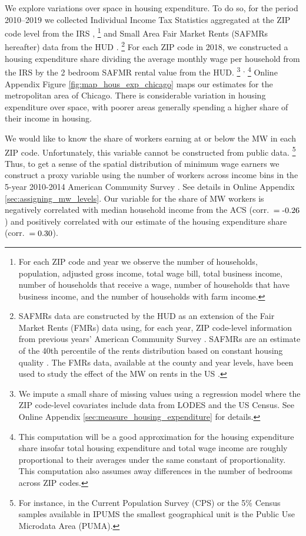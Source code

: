 We explore variations over space in housing expenditure.
To do so, for the period 2010--2019
we collected Individual Income Tax Statistics aggregated at the ZIP code 
level from the IRS \parencite{IRS},%
\footnote{For each ZIP code and year we observe the number of households, 
population, adjusted gross income, total wage bill, total business income, 
number of households that receive a wage, number of households that have 
business income, and the number of households with farm income.}
and Small Area Fair Market Rents (SAFMRs hereafter) data from the HUD 
\parencite{hudSAFMR}.%
\footnote{SAFMRs data are constructed by the HUD as an extension of the
Fair Market Rents (FMRs) data using, for each year, ZIP code-level information
from previous years' American Community Survey 
\parencite[][, p.\ 35]{SafmrReport2018}.
SAFMRs are an estimate of the 40th percentile of the rents distribution
based on constant housing quality \parencite[][, p.\ 1]{SafmrReport2018}.
The FMRs data, available at the county and year levels, have been used to study 
the effect of the MW on rents in the US \parencite{Tidemann2018, Yamagishi2019}.}
For each ZIP code in 2018, we constructed a housing expenditure share dividing 
the average monthly wage per household from the IRS by the 2 bedroom SAFMR 
rental value from the HUD.%
\footnote{We impute a small share of missing values using a regression model 
	where the ZIP code-level covariates include data from LODES and the US 
	Census.
	See Online Appendix \ref{sec:measure_housing_expenditure} for details.}%
\textsuperscript{,}%
\footnote{This computation will be a good approximation for the housing 
	expenditure share insofar total housing expenditure and total wage income 
	are roughly proportional to their averages under the same constant of 
	proportionality.
	This computation also assumes away differences in the number of bedrooms 
	across ZIP codes.}
Online Appendix Figure \ref{fig:map_hous_exp_chicago} maps our estimates for the 
metropolitan area of Chicago.
There is considerable variation in housing expenditure over space, with poorer
areas generally spending a higher share of their income in housing.

We would like to know the share of workers earning at or below the MW in each 
ZIP code.
Unfortunately, this variable cannot be constructed from public data.%
\footnote{For instance, in the Current Population Survey (CPS) or the 5\% 
	Census samples available in IPUMS the smallest geographical unit is the 
	Public Use Microdata Area (PUMA).}
Thus, to get a sense of the spatial distribution of minimum wage earners we 
construct a proxy variable using the number of workers across income bins
in the 5-year 2010-2014 American Community Survey \parencite[ACS;][]{CensusACS}.
See details in Online Appendix \ref{sec:assigning_mw_levels}.
Our variable for the share of MW workers is negatively correlated with median 
household income from the ACS (corr.\ $=\textnormal{-0.26}$) and 
positively correlated with our estimate of the housing expenditure share 
(corr.\ $=\textnormal{0.30}$).

